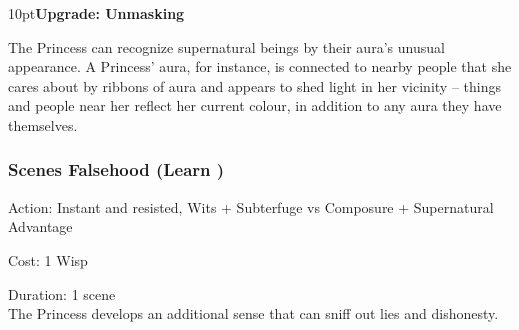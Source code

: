 \begin{myindentpar}{10pt}\textbf{Upgrade: Unmasking}

The Princess can recognize supernatural beings by their aura's unusual appearance. A Princess' aura, for instance, is connected to nearby people that she cares about by ribbons of aura and appears to shed light in her vicinity -- things and people near her reflect her current colour, in addition to any aura they have themselves. \end{myindentpar}

\subsubsection*{Scenes Falsehood (Learn \textbullet)}

\noindent Action: Instant and resisted, Wits + Subterfuge vs Composure + Supernatural Advantage

\noindent Cost: 1 Wisp

\noindent Duration: 1 scene \\

\noindent The Princess develops an additional sense that can sniff out lies and dishonesty.

